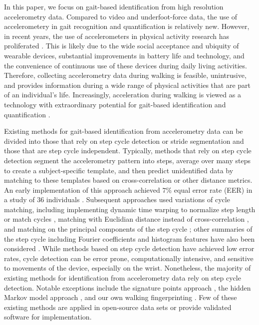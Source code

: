  
In this paper, we focus on gait-based identification from high resolution accelerometry data. Compared to video and underfoot-force data, the use of accelerometery in gait recognition and quantification is relatively new.  However, in recent years, the use of accelerometers in physical activity research has proliferated \cite{karas_accelerometry_2019}. This is likely due to the wide social acceptance and ubiquity of wearable devices, substantial improvements in battery life and technology, and the convenience of continuous use of these devices during daily living activities. Therefore, collecting accelerometry data during walking is feasible, unintrusive, and provides information during a wide range of physical activities that are part of an individual's life.  Increasingly, acceleration during walking is viewed as a technology with extraordinary potential for gait-based identification and quantification \cite{gafurov_biometric_2006}. 


Existing methods for gait-based identification from accelerometry data can be divided into those that rely on step cycle detection or stride segmentation and those that are step cycle independent. Typically, methods that rely on step cycle detection segment the accelerometry pattern into steps, average over many steps to create a subject-specific template, and then predict unidentified data by matching to these templates based on cross-correlation or other distance metrics. An early implementation of this approach achieved $7$\% equal error rate (EER) in a study of $36$ individuals \cite{mantyjarvi_identifying_2005}. Subsequent approaches used variations of cycle matching, including implementing dynamic time warping to normalize step length \cite{rong_wearable_2007} or match cycles \cite{derawi_unobtrusive_2010},  matching with Euclidian distance instead of cross-correlation \cite{gafurov_improved_2010}, and matching on the principal components of the step cycle \cite{bours_eigensteps_2010}; other summaries of the step cycle including Fourier coefficients and histogram features have also been considered \cite{mantyjarvi_identifying_2005, gafurov_biometric_2006}. While methods based on step cycle detection have achieved low error rates, cycle detection can be error prone, computationally intensive, and sensitive to movements of the device, especially on the wrist. Nonetheless, the majority of existing methods for identification from accelerometry data rely on step cycle detection. Notable exceptions include the signature points approach  \cite{zhang_accelerometer-based_2015}, the hidden Markov model approach \cite{nickel_using_2011}, and our own walking fingerprinting \cite{koffman_fingerprinting_2023}. Few of these existing methods are applied in open-source data sets or provide validated software for implementation.

